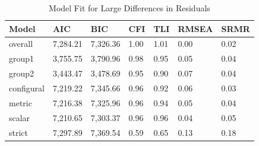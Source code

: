 \documentclass[
  man]{apa6}
\begin{document}
\begin{table}[tbp]

\begin{center}
\begin{threeparttable}

\caption{\label{tab:unnamed-chunk-10}Model Fit for Large Differences in Residuals}

\begin{tabular}{lllllll}
\toprule
Model & AIC & BIC & CFI & TLI & RMSEA & SRMR\\
\midrule
overall & 7,284.21 & 7,326.36 & 1.00 & 1.01 & 0.00 & 0.02\\
group1 & 3,755.75 & 3,790.96 & 0.98 & 0.95 & 0.05 & 0.04\\
group2 & 3,443.47 & 3,478.69 & 0.95 & 0.90 & 0.07 & 0.04\\
configural & 7,219.22 & 7,345.66 & 0.96 & 0.92 & 0.06 & 0.03\\
metric & 7,216.38 & 7,325.96 & 0.96 & 0.94 & 0.05 & 0.04\\
scalar & 7,210.65 & 7,303.37 & 0.96 & 0.96 & 0.04 & 0.05\\
strict & 7,297.89 & 7,369.54 & 0.59 & 0.65 & 0.13 & 0.18\\
\bottomrule
\end{tabular}

\end{threeparttable}
\end{center}

\end{table}
\end{document}
